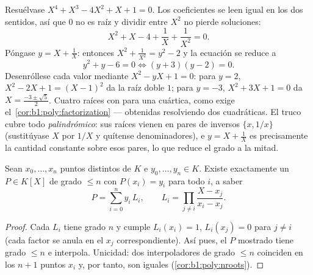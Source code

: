 \begin{example}\label{ex:b1:poly:palindrome}
Resuélvase $X^4 + X^3 - 4X^2 + X + 1 = 0$. Los coeficientes se leen
igual en los dos sentidos, así que $0$ no es raíz y dividir entre $X^2$
no pierde soluciones:
\[
X^2 + X - 4 + \frac1X + \frac1{X^2} = 0 .
\]
Póngase $y = X + \frac1X$: entonces $X^2 + \frac1{X^2} = y^2 - 2$ y la
ecuación se reduce a
\[
y^2 + y - 6 = 0 \iff (y + 3)(y - 2) = 0 .
\]
Desenróllese cada valor mediante $X^2 - yX + 1 = 0$: para $y = 2$,
$X^2 - 2X + 1 = (X - 1)^2$ da la raíz doble $1$; para $y = -3$,
$X^2 + 3X + 1 = 0$ da $X = \frac{-3 \pm \sqrt5}2$. Cuatro raíces con
 para una cuártica, como exige
el~\cref{cor:b1:poly:factorization} --- obtenidas resolviendo dos
cuadráticas. El truco cubre todo  \emph{palindrómico}: sus
raíces vienen en pares de inversos $\{x, 1/x\}$ (sustitúyase $X$ por
$1/X$ y quítense denominadores), e $y = X + \frac1X$ es precisamente la
cantidad constante sobre esos pares, lo que reduce el grado a la mitad.
\end{example}

\begin{theorem}\label{thm:b1:poly:lagrange}
Sean $x_0, \dots, x_n$ puntos distintos de $K$ e
$y_0, \dots, y_n \in K$. Existe exactamente un $P \in K[X]$ de grado
$\leq n$ con $P(x_i) = y_i$ para todo $i$, a saber
\[
P = \sum_{i=0}^{n} y_i\, L_i,
\qquad
L_i = \prod_{j \neq i} \frac{X - x_j}{x_i - x_j} .
\]
\end{theorem}

\begin{proof}
Cada $L_i$ tiene grado $n$ y cumple $L_i(x_i) = 1$, $L_i(x_j) = 0$ para
$j \neq i$ (cada factor se anula en el $x_j$ correspondiente). Así
pues, el $P$ mostrado tiene grado $\leq n$ e interpola. Unicidad: dos
 interpoladores de grado $\leq n$ coinciden en los $n+1$
puntos $x_i$ y, por tanto, son iguales (\cref{cor:b1:poly:nroots}).
\end{proof}

